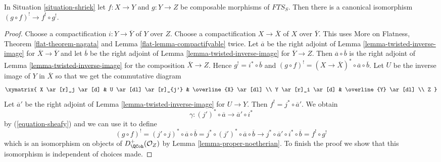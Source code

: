 \begin{lemma}
\label{lemma-upper-shriek-composition}
In Situation \ref{situation-shriek} let $f : X \to Y$ and $g : Y \to Z$
be composable morphisms of $\textit{FTS}_S$. Then there is a canonical
isomorphism $(g \circ f)^! \to f^! \circ g^!$.
\end{lemma}

\begin{proof}
Choose a compactification $i : Y \to \overline{Y}$ of $Y$ over $Z$.
Choose a compactification $X \to \overline{X}$ of $X$ over
$\overline{Y}$. This uses More on Flatness, Theorem \ref{flat-theorem-nagata}
and Lemma \ref{flat-lemma-compactifyable} twice.
Let $\overline{a}$ be the
right adjoint of Lemma \ref{lemma-twisted-inverse-image} for
$\overline{X} \to \overline{Y}$ and let $\overline{b}$
be the
right adjoint of Lemma \ref{lemma-twisted-inverse-image} for
$\overline{Y} \to Z$.
Then $\overline{a} \circ \overline{b}$ is the
right adjoint of Lemma \ref{lemma-twisted-inverse-image} for
the composition $\overline{X} \to Z$.
Hence $g^! = i^* \circ \overline{b}$ and
$(g \circ f)^! = (X \to \overline{X})^* \circ \overline{a} \circ \overline{b}$.
Let $U$ be the inverse image of $Y$ in $\overline{X}$
so that we get the commutative diagram
$$
\xymatrix{
X \ar[r]_j \ar[d] & U \ar[dl] \ar[r]_{j'} & \overline{X} \ar[dl] \\
Y \ar[r]_i \ar[d] & \overline{Y} \ar[dl] \\
Z
}
$$
Let $\overline{a}'$ be the
right adjoint of Lemma \ref{lemma-twisted-inverse-image} for
$U \to Y$.
Then $f^! = j^* \circ \overline{a}'$. We obtain
$$
\gamma : (j')^* \circ \overline{a} \to \overline{a}' \circ i^*
$$
by (\ref{equation-sheafy}) and we can use it to define
$$
(g \circ f)^! =
(j' \circ j)^* \circ \overline{a} \circ \overline{b} =
j^* \circ (j')^* \circ \overline{a} \circ \overline{b}
\to
j^* \circ \overline{a}' \circ i^* \circ \overline{b} =
f^! \circ g^!
$$
which is an isomorphism on objects of $D_\QCoh^+(\mathcal{O}_Z)$ by
Lemma \ref{lemma-proper-noetherian}. To finish the proof we show that
this isomorphism is independent of choices made.


\end{proof}
